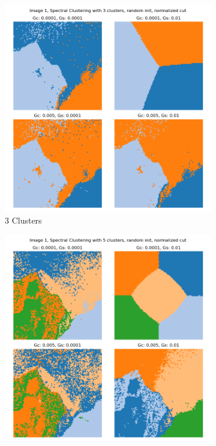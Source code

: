\documentclass{homework}
\begin{document}
\begin{figure}[H]
    \centering
    \begin{subfigure}{0.32\textwidth}
        \centering
        \includegraphics[width=\textwidth]{output_grid/image1_sc-normalized-random-3.png}
        \caption{3 Clusters}
    \end{subfigure}
    \begin{subfigure}{0.32\textwidth}
        \centering
        \includegraphics[width=\textwidth]{output_grid/image1_sc-normalized-random-5.png}

\end{subfigure}
\end{figure}
\end{document}
